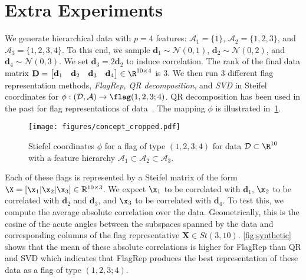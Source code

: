 \section{Extra Experiments}
We generate hierarchical data with $p=4$ features: $\mathcal{A}_1 = \{1\}$, $\mathcal{A}_2 = \{1,2,3\}$, and $\mathcal{A}_3 = \{1,2,3,4\}$. To this end, we sample $\mathbf{d}_1\sim\mathcal{N}(0,1)$, $\mathbf{d}_2\sim\mathcal{N}(0,2)$, and $\mathbf{d}_4\sim\mathcal{N}(0,3)$. We set $\mathbf{d}_3=2\mathbf{d}_2$ to induce correlation. The rank of the final data matrix $\mathbf{D} = \begin{bmatrix} \mathbf{d}_1 & \mathbf{d}_2  & \mathbf{d}_3 & \mathbf{d}_4 \end{bmatrix} \in \R^{10 \times 4}$ is $3$.
We then run $3$ different flag representation methods, \emph{FlagRep, QR decomposition}, and \emph{SVD} in Steifel coordinates for $\phi : (\mathcal{D}, \mathcal{A}) \rightarrow \flag(1,2,3;4)$. QR decomposition has been used in the past for flag representations of data~\cite{Mankovich_2023_ICCV}. The mapping $\phi$ is illustrated in~\cref{fig:concept}.

\begin{figure}[ht!]
    \centering
    \texttt{[image: figures/concept\_cropped.pdf]}\vspace{-3mm}
    \caption{Stiefel coordinates $\phi$ for a flag of type $(1,2,3;4)$ for data $\mathcal{D} \subset \R^{10}$ with a feature hierarchy $\mathcal{A}_1 \subset \mathcal{A}_2 \subset \mathcal{A}_3 $.\vspace{-2mm}}
    \label{fig:concept}
\end{figure}

Each of these flags is represented by a Steifel matrix of the form $\X = [\x_1 | \x_2 |\x_3]  \in \mathbb{R}^{10 \times 3}$. We expect $\x_1$ to be correlated with $\mathbf{d}_1$, $\x_2$ to be correlated with $\mathbf{d}_2$ and $\mathbf{d}_3$, and $\x_3$ to be correlated with $\mathbf{d}_4$. To test this, we compute the average absolute correlation over the data. Geometrically, this is the cosine of the acute angles between the subspaces spanned by the data and corresponding columns of the flag representative $\mathbf{X} \in St(3,10)$.
\cref{fig:synthetic} shows that the mean of these absolute correlations is higher for FlagRep than QR and SVD which indicates that FlagRep produces the best representation of these data as a flag of type $(1,2,3;4)$.

